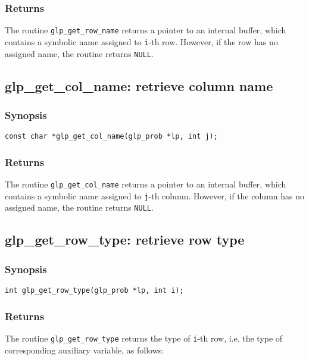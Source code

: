 \subsubsection*{Returns}

The routine \verb|glp_get_row_name| returns a pointer to an internal
buffer, which contains a symbolic name assigned to \verb|i|-th row.
However, if the row has no assigned name, the routine returns
\verb|NULL|.

\subsection{glp\_get\_col\_name: retrieve column name}

\subsubsection*{Synopsis}

\begin{verbatim}
const char *glp_get_col_name(glp_prob *lp, int j);
\end{verbatim}

\subsubsection*{Returns}

The routine \verb|glp_get_col_name| returns a pointer to an internal
buffer, which contains a symbolic name assigned to \verb|j|-th column.
However, if the column has no assigned name, the routine returns
\verb|NULL|.

\subsection{glp\_get\_row\_type: retrieve row type}

\subsubsection*{Synopsis}

\begin{verbatim}
int glp_get_row_type(glp_prob *lp, int i);
\end{verbatim}

\subsubsection*{Returns}

The routine \verb|glp_get_row_type| returns the type of \verb|i|-th
row, i.e. the type of corresponding auxiliary variable, as follows:

